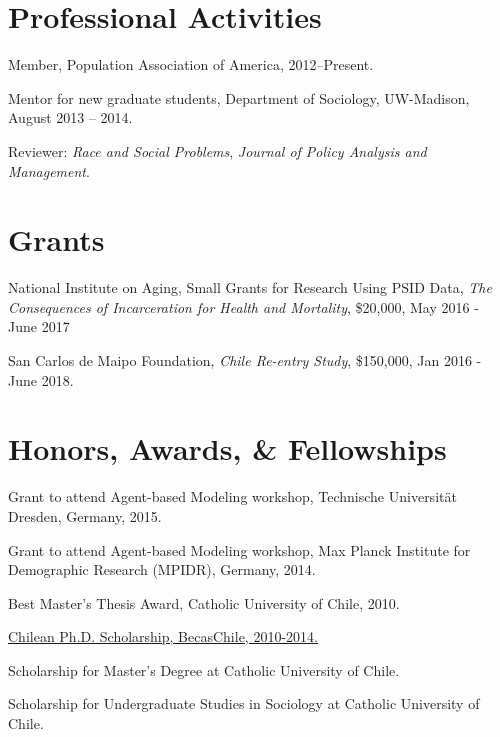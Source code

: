 \documentclass[10pt,letterpaper]{article}
\renewenvironment{itemize}{
  \begin{list}{}{
    \setlength{\leftmargin}{1.5em}
    \setlength{\itemsep}{0.25em}
    \setlength{\parskip}{0pt}
    \setlength{\parsep}{0.25em}
  }
}{
  \end{list}
}
\begin{document}
\section*{Professional Activities}

\begin{itemize}
\item Member, Population Association of America, 2012--Present.
\item Mentor for new graduate students, Department of Sociology, UW-Madison,
August 2013 – 2014.
\item Reviewer: \textit{Race and Social Problems}, \textit{Journal of Policy Analysis and Management}.
\end{itemize}

\section*{Grants}

\begin{itemize}
\item National Institute on Aging, Small Grants for Research Using PSID Data, \textit{The Consequences of Incarceration for Health and Mortality},  \$20,000, May 2016 - June 2017
\item San Carlos de Maipo Foundation, \textit{Chile Re-entry Study}, \$150,000, Jan 2016 - June 2018.
\end{itemize}


\section*{Honors, Awards, \& Fellowships}

\begin{itemize}
\item Grant to attend Agent-based Modeling workshop, Technische Universität Dresden, Germany, 2015.
\item Grant to attend Agent-based Modeling workshop, Max Planck Institute for Demographic Research (MPIDR), Germany, 2014.
\item Best Master's Thesis Award, Catholic University of Chile, 2010.
\item \href{http://www.becaschile.cl}{Chilean Ph.D. Scholarship, BecasChile, 2010-2014.}
\item Scholarship for Master’s Degree at Catholic University of Chile.
\item Scholarship for Undergraduate Studies in Sociology at Catholic University of Chile.
\end{itemize}
\end{document}
